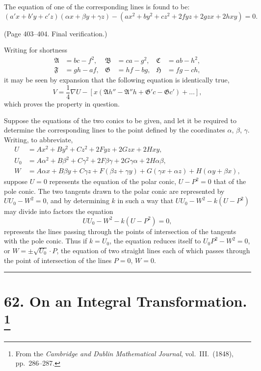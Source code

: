 \documentclass[11pt,a4paper]{article}
\theoremstyle{plain}
\theoremstyle{definition}
\begin{document}
The equation of one of the corresponding lines is found to be:
\[
(a'x + b'y + c'z)(\alpha x + \beta y + \gamma z) - (ax^2 + by^2 + cz^2 + 2fyz + 2gzx + 2hxy) = 0.
\]

(Page 403--404. Final verification.)

Writing for shortness
\begin{align*}
\mathfrak{A} &= bc - f^2, & \mathfrak{B} &= ca - g^2, & \mathfrak{C} &= ab - h^2, \\
\mathfrak{F} &= gh - af, & \mathfrak{G} &= hf - bg, & \mathfrak{H} &= fg - ch,
\end{align*}
it may be seen by expansion that the following equation is identically true,
\[
V = \frac{1}{4}\nabla U - [x(\mathfrak{A}h'' - \mathfrak{A}''h + \mathfrak{G}'c - \mathfrak{G}c') + \ldots],
\]
which proves the property in question.

Suppose the equations of the two conics to be given, and let it be required to
determine the corresponding lines to the point defined by the coordinates $\alpha$, $\beta$, $\gamma$.
Writing, to abbreviate,
\begin{align*}
U &= Ax^2 + By^2 + Cz^2 + 2Fyz + 2Gzx + 2Hxy, \\
U_0 &= A\alpha^2 + B\beta^2 + C\gamma^2 + 2F\beta\gamma + 2G\gamma\alpha + 2H\alpha\beta, \\
W &= A\alpha x + B\beta y + C\gamma z + F(\beta z + \gamma y) + G(\gamma x + \alpha z) + H(\alpha y + \beta x),
\end{align*}
suppose $U = 0$ represents the equation of the polar conic, $U - P^2 = 0$ that of the pole
conic. The two tangents drawn to the polar conic are represented by $UU_0 - W^2 = 0$, and
by determining $k$ in such a way that $UU_0 - W^2 - k(U - P^2)$ may divide into factors
the equation
\[
UU_0 - W^2 - k(U - P^2) = 0,
\]
represents the lines passing through the points of intersection of the tangents with the pole
conic. Thus if $k = U_0$, the equation reduces itself to $U_0P^2 - W^2 = 0$, or $W = \pm\sqrt{U_0} \cdot P$,
the equation of two straight lines each of which passes through the point of intersection
of the lines $P = 0$, $W = 0$.

\bigskip
\hrule
\bigskip

\newpage
\section[On an Integral Transformation]{%
62. On an Integral Transformation.%
\footnote{From the \textit{Cambridge and Dublin Mathematical Journal}, vol.~III.\ (1848), pp.~286--287.}}
\end{document}
